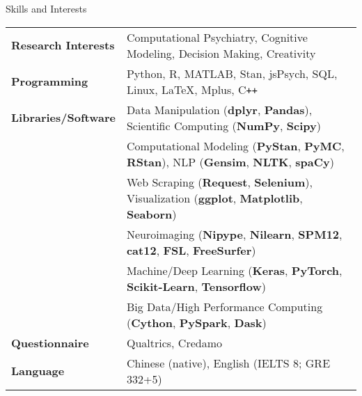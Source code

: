 \documentclass{resume} %
\begin{document}
\begin{rSection}{Skills and Interests}

\begin{tabular}{ @{} >{\bfseries}l @{\hspace{6ex}} l }
Research Interests & Computational Psychiatry, Cognitive Modeling, Decision Making, Creativity \\
Programming & Python, R, MATLAB, Stan, jsPsych, SQL, Linux, \LaTeX, Mplus, C\texttt{++}\\
Libraries/Software & Data Manipulation (\textbf{dplyr}, \textbf{Pandas}), Scientific Computing (\textbf{NumPy}, \textbf{Scipy}) \\
                   & Computational Modeling (\textbf{PyStan}, \textbf{PyMC}, \textbf{RStan}), NLP (\textbf{Gensim}, \textbf{NLTK}, \textbf{spaCy}) \\
                   & Web Scraping (\textbf{Request}, \textbf{Selenium}), Visualization (\textbf{ggplot}, \textbf{Matplotlib}, \textbf{Seaborn}) \\
                   & Neuroimaging (\textbf{Nipype}, \textbf{Nilearn}, \textbf{SPM12}, \textbf{cat12}, \textbf{FSL}, \textbf{FreeSurfer})\\
                   & Machine/Deep Learning (\textbf{Keras}, \textbf{PyTorch}, \textbf{Scikit-Learn}, \textbf{Tensorflow}) \\ 
                   & Big Data/High Performance Computing (\textbf{Cython}, \textbf{PySpark}, \textbf{Dask}) \\
Questionnaire & Qualtrics, Credamo \\ 
Language & Chinese (native), English (IELTS 8; GRE 332+5)
\end{tabular}\\
\end{rSection}
\end{document}

